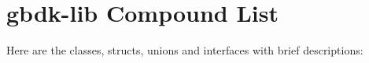 \section{gbdk-lib Compound List}
Here are the classes, structs, unions and interfaces with brief descriptions:\begin{CompactList}
\item{}
\end{CompactList}
